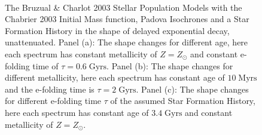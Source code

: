 \begin{figure}
\\ 
 \quad {} 
  \caption{The Bruzual \& Charlot 2003\cite{BC2003} Stellar Population Models with the Chabrier 2003\cite{Chabrier2003} Initial Mass function, Padova\cite{Padova1994}\cite{Padova2000}\cite{Padova2008} Isochrones and a Star Formation History in the shape of delayed exponential decay, unattenuated. Panel (a): The shape changes for different age, here each spectrum has constant metallicity of $Z = Z_\odot$ and constant e-folding time of $\tau = 0.6 \; \mbox{Gyrs}$. Panel (b): The shape changes for different metallicity, here each spectrum has constant age of $10 \; \mbox{Myrs}$ and the e-folding time is $\tau = 2 \; \mbox{Gyrs}$. Panel (c): The shape changes for different e-folding time $\tau$ of the assumed Star Formation History, here each spectrum has constant age of $3.4 \; \mbox{Gyrs}$ and constant metallicity of $Z = Z_\odot$. }
  \label{fig:StellarPop_temp}
\end{figure}
